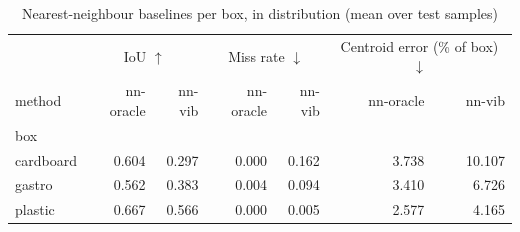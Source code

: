 \begin{table}
\caption{Nearest-neighbour baselines per box, in distribution (mean over test samples)}
\label{tab:baselines_per_box}
\begin{tabular}{lrrrrrr}
\toprule
 & \multicolumn{2}{c}{IoU $\uparrow$} & \multicolumn{2}{c}{Miss rate $\downarrow$} & \multicolumn{2}{c}{Centroid error (\% of box) $\downarrow$} \\
method & nn-oracle & nn-vib & nn-oracle & nn-vib & nn-oracle & nn-vib \\
box &  &  &  &  &  &  \\
\midrule
cardboard & 0.604 & 0.297 & 0.000 & 0.162 & 3.738 & 10.107 \\
gastro & 0.562 & 0.383 & 0.004 & 0.094 & 3.410 & 6.726 \\
plastic & 0.667 & 0.566 & 0.000 & 0.005 & 2.577 & 4.165 \\
\bottomrule
\end{tabular}
\end{table}
